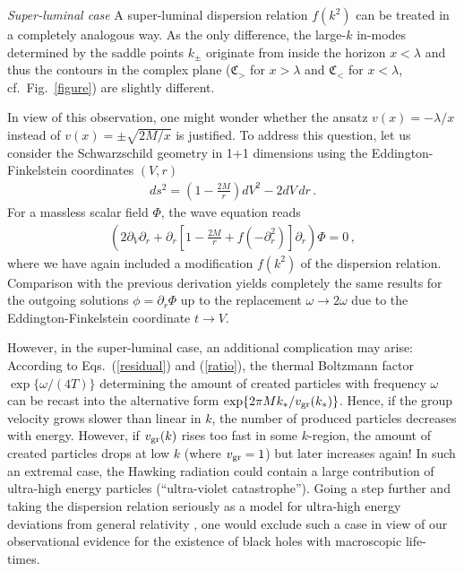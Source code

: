 \documentclass[aps,prl,showpacs,amssymb,nofootinbib,twocolumn]{revtex4}
\newcommand{\bea}{\begin{eqnarray}}
\newcommand{\ea}{\end{eqnarray}}
\begin{document}
{\em Super-luminal case}\quad
%
A super-luminal dispersion relation $f(k^2)$ can be treated in a
completely analogous way.
%
As the only difference, the large-$k$ in-modes determined by the
saddle points $k_\pm$ originate from inside the horizon $x<\lambda$
and thus the contours in the complex plane 
(${\mathfrak C}_>$ for $x>\lambda$ and ${\mathfrak C}_<$ for
$x<\lambda$, cf.~Fig.~\ref{figure}) are slightly different.

In view of this observation, one might wonder whether the ansatz 
$v(x)=-\lambda/x$ instead of $v(x)=\pm\sqrt{2M/x}$ is justified. 
%
To address this question, let us consider the Schwarzschild geometry
in 1+1 dimensions using the Eddington-Finkelstein coordinates $(V,r)$ 
%
\bea
ds^2=\left(1-\frac{2M}{r}\right)dV^2-2dV\,dr
\,.
\ea
%
For a massless scalar field $\Phi$, the wave equation reads 
%
\bea
\left(2\partial_V\partial_r+
\partial_r\left[1-\frac{2M}{r}+f(-\partial_r^2)\right]\partial_r
\right)\Phi=0
\,,
\ea
%
where we have again included a modification $f(k^2)$ of the dispersion 
relation. 
%
Comparison with the previous derivation yields completely the same
results for the outgoing solutions $\phi=\partial_r\Phi$ up to the
replacement $\omega\to2\omega$ due to the Eddington-Finkelstein
coordinate $t \to V$. 

However, in the super-luminal case, an additional complication may
arise: 
%
According to Eqs.~(\ref{residual}) and (\ref{ratio}), the thermal
Boltzmann factor $\exp\{\omega/(4T)\}$ determining the amount of
created particles with frequency $\omega$ can be recast into 
the alternative form $\exp\{2\pi M k_*/v_{\rm gr}(k_*)\}$.  
%
Hence, if the group velocity grows slower than linear in $k$,  
the number of produced particles decreases with energy.  
%
However, if $v_{\rm gr}(k)$ rises too fast in some $k$-region, the
amount of created particles drops at low $k$ (where $v_{\rm gr}=1$)
but later increases again!
%
In such an extremal case, the Hawking radiation could contain a large  
contribution of ultra-high energy particles 
(``ultra-violet catastrophe'').  
%
Going a step further and taking the dispersion relation seriously as a
model for ultra-high energy deviations from general relativity
\cite{metric}, one would exclude such a case in view of our
observational evidence for the existence of black holes with
macroscopic life-times.  
\end{document}
